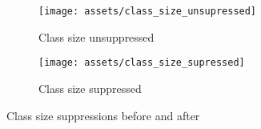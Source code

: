 \begin{figure}[ht]
  \centering

  \begin{subfigure}{0.49\textwidth}
    \centering
    \texttt{[image: assets/class\_size\_unsupressed]}
    \caption{Class size unsuppressed}
    \label{fig:subim1}
  \end{subfigure}
  \hfill
  \begin{subfigure}{0.49\textwidth}
    \centering
    \texttt{[image: assets/class\_size\_supressed]}
    \caption{Class size suppressed}
    \label{fig:subim2}
  \end{subfigure}

  \caption{Class size suppressions before and after}
  \label{fig:image2}
\end{figure}
